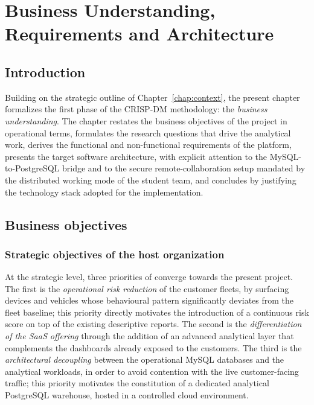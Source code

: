 \chapter{Business Understanding, Requirements and Architecture}
\label{chap:business}

\section{Introduction}
Building on the strategic outline of Chapter~\ref{chap:context}, the present chapter formalizes the first phase of the CRISP-DM methodology: the \emph{business understanding}. The chapter restates the business objectives of the project in operational terms, formulates the research questions that drive the analytical work, derives the functional and non-functional requirements of the platform, presents the target software architecture, with explicit attention to the MySQL-to-PostgreSQL bridge and to the secure remote-collaboration setup mandated by the distributed working mode of the student team, and concludes by justifying the technology stack adopted for the implementation.

\section{Business objectives}

\subsection{Strategic objectives of the host organization}
At the strategic level, three priorities of \hostorg{} converge towards the present project. The first is the \emph{operational risk reduction} of the customer fleets, by surfacing devices and vehicles whose behavioural pattern significantly deviates from the fleet baseline; this priority directly motivates the introduction of a continuous risk score on top of the existing descriptive reports. The second is the \emph{differentiation of the SaaS offering} through the addition of an advanced analytical layer that complements the dashboards already exposed to the customers. The third is the \emph{architectural decoupling} between the operational MySQL databases and the analytical workloads, in order to avoid contention with the live customer-facing traffic; this priority motivates the constitution of a dedicated analytical PostgreSQL warehouse, hosted in a controlled cloud environment.

